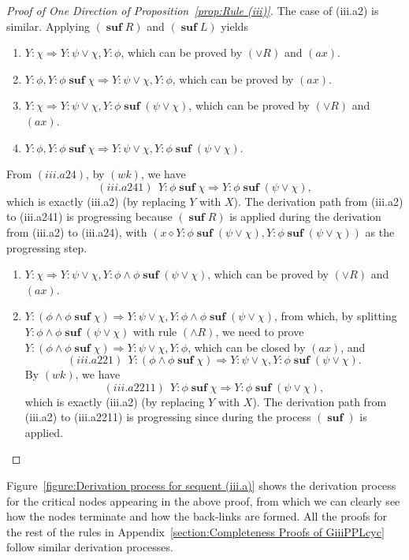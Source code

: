 \documentclass[manuscript,screen]{acmart}
\newcommand{\cat}[0]{\diamond}
\DeclareMathOperator{\osuf}{\mathbf{suf}}
\begin{document}
\begin{proof}[Proof of One Direction of Proposition~\ref{prop:Rule (iii)}]
The case of (iii.a2) is similar. 
Applying $(\osuf R)$ and $(\osuf L)$ yields 
\begin{enumerate}
\item[$(iii.a21)$] $Y : \chi \Rightarrow Y : \psi\vee \chi, Y : \phi$, which can be proved by $(\vee R)$ and $(ax)$. 
\item[$(iii.a22)$] $Y : \phi, Y : \phi\osuf \chi\Rightarrow Y : \psi\vee \chi, Y : \phi$, which can be proved by $(ax)$. 
\item[$(iii.a23)$] $Y : \chi \Rightarrow Y : \psi\vee \chi, Y : \phi\osuf (\psi\vee \chi)$, which can be proved by $(\vee R)$ and $(ax)$. 
\item[$(iii.a24)$] $Y : \phi, Y : \phi\osuf\chi \Rightarrow Y : \psi\vee \chi, Y : \phi\osuf (\psi\vee \chi)$. 
\end{enumerate}
From $(iii.a24)$, by $(wk)$, we have 
$$
(iii.a241)\ \ Y : \phi\osuf \chi\Rightarrow Y : \phi\osuf (\psi\vee \chi), 
$$
which is exactly (iii.a2) (by replacing $Y$ with $X$). 
The derivation path from (iii.a2) to (iii.a241) is progressing because $(\osuf R)$ is applied during the derivation from (iii.a2) to (iii.a24), with $(x\cat Y : \phi\osuf (\psi\vee \chi), Y : \phi\osuf(\psi\vee \chi))$ as the progressing step. 

\ifx
\begin{enumerate}
\item[$(iii.a21)$] $Y : \chi \Rightarrow Y : \psi\vee \chi, Y : \phi\wedge \phi\osuf (\psi\vee \chi)$, which can be proved by $(\vee R)$ and $(ax)$. 
\item[$(iii.a22)$]   $Y : (\phi\wedge \phi\osuf \chi)\Rightarrow Y : \psi\vee \chi, Y : \phi\wedge \phi\osuf (\psi\vee \chi)$, from which, by splitting $Y : \phi\wedge \phi\osuf (\psi\vee \chi)$ with rule $(\wedge R)$, we need to prove $Y : (\phi\wedge \phi\osuf \chi)\Rightarrow Y : \psi\vee \chi, Y : \phi$, which can be closed by $(ax)$, and 
$$
(iii.a221)\ \ Y : (\phi\wedge \phi\osuf \chi)\Rightarrow Y : \psi\vee \chi, Y : \phi\osuf (\psi\vee \chi). 
$$
By $(wk)$, we have
$$
(iii.a2211)\ \ Y : \phi\osuf \chi\Rightarrow Y : \phi\osuf (\psi\vee \chi), 
$$
which is exactly (iii.a2) (by replacing $Y$ with $X$). 
The derivation path from (iii.a2) to (iii.a2211) is progressing since during the process $(\osuf)$ is applied. 
\end{enumerate}
\fi
\end{proof}

Figure~\ref{figure:Derivation process for sequent (iii.a)} shows the derivation process for the critical nodes appearing in the above proof, from which we can clearly see how the nodes terminate and how the back-links are formed. 
All the proofs for the rest of the rules in Appendix~\ref{section:Completeness Proofs of GiiiPPLcyc}  follow similar derivation processes. 
\end{document}
